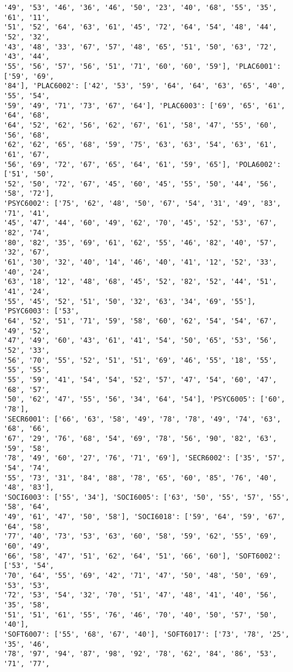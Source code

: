 \documentclass[11pt]{article}
\begin{document}
\begin{Verbatim}[commandchars=\\\{\}]
'49', '53', '46', '36', '46', '50', '23', '40', '68', '55', '35', '61', '11',
'51', '52', '64', '63', '61', '45', '72', '64', '54', '48', '44', '52', '32',
'43', '48', '33', '67', '57', '48', '65', '51', '50', '63', '72', '43', '44',
'55', '56', '57', '56', '51', '71', '60', '60', '59'], 'PLAC6001': ['59', '69',
'84'], 'PLAC6002': ['42', '53', '59', '64', '64', '63', '65', '40', '55', '54',
'59', '49', '71', '73', '67', '64'], 'PLAC6003': ['69', '65', '61', '64', '68',
'64', '52', '62', '56', '62', '67', '61', '58', '47', '55', '60', '56', '68',
'62', '62', '65', '68', '59', '75', '63', '63', '54', '63', '61', '61', '67',
'56', '69', '72', '67', '65', '64', '61', '59', '65'], 'POLA6002': ['51', '50',
'52', '50', '72', '67', '45', '60', '45', '55', '50', '44', '56', '58', '72'],
'PSYC6002': ['75', '62', '48', '50', '67', '54', '31', '49', '83', '71', '41',
'45', '47', '44', '60', '49', '62', '70', '45', '52', '53', '67', '82', '74',
'80', '82', '35', '69', '61', '62', '55', '46', '82', '40', '57', '32', '67',
'61', '30', '32', '40', '14', '46', '40', '41', '12', '52', '33', '40', '24',
'63', '18', '12', '48', '68', '45', '52', '82', '52', '44', '51', '41', '24',
'55', '45', '52', '51', '50', '32', '63', '34', '69', '55'], 'PSYC6003': ['53',
'64', '52', '51', '71', '59', '58', '60', '62', '54', '54', '67', '49', '52',
'47', '49', '60', '43', '61', '41', '54', '50', '65', '53', '56', '52', '33',
'56', '70', '55', '52', '51', '51', '69', '46', '55', '18', '55', '55', '55',
'55', '59', '41', '54', '54', '52', '57', '47', '54', '60', '47', '68', '57',
'50', '62', '47', '55', '56', '34', '64', '54'], 'PSYC6005': ['60', '78'],
'SECR6001': ['66', '63', '58', '49', '78', '78', '49', '74', '63', '68', '66',
'67', '29', '76', '68', '54', '69', '78', '56', '90', '82', '63', '59', '58',
'78', '49', '60', '27', '76', '71', '69'], 'SECR6002': ['35', '57', '54', '74',
'55', '73', '31', '84', '88', '78', '65', '60', '85', '76', '40', '48', '83'],
'SOCI6003': ['55', '34'], 'SOCI6005': ['63', '50', '55', '57', '55', '58', '64',
'49', '61', '47', '50', '58'], 'SOCI6018': ['59', '64', '59', '67', '64', '58',
'77', '40', '73', '53', '63', '60', '58', '59', '62', '55', '69', '60', '49',
'66', '58', '47', '51', '62', '64', '51', '66', '60'], 'SOFT6002': ['53', '54',
'70', '64', '55', '69', '42', '71', '47', '50', '48', '50', '69', '53', '53',
'72', '53', '54', '32', '70', '51', '47', '48', '41', '40', '56', '35', '58',
'51', '51', '61', '55', '76', '46', '70', '40', '50', '57', '50', '40'],
'SOFT6007': ['55', '68', '67', '40'], 'SOFT6017': ['73', '78', '25', '35', '46',
'78', '97', '94', '87', '98', '92', '78', '62', '84', '86', '53', '71', '77',

\end{Verbatim}
\end{document}
